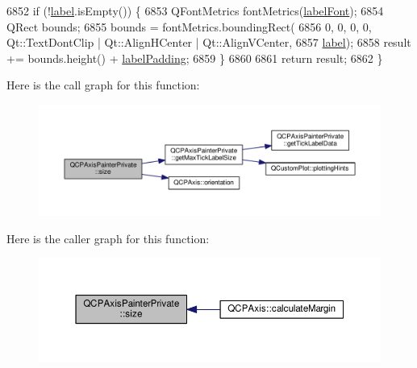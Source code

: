 \begin{DoxyCode}
6852   \textcolor{keywordflow}{if} (!\hyperlink{class_q_c_p_axis_painter_private_afe004c322f92543c0467afc02da6cf6d}{label}.isEmpty()) \{
6853     QFontMetrics fontMetrics(\hyperlink{class_q_c_p_axis_painter_private_add1ff1030fbc36112c19b1468ad82d55}{labelFont});
6854     QRect bounds;
6855     bounds = fontMetrics.boundingRect(
6856         0, 0, 0, 0, Qt::TextDontClip | Qt::AlignHCenter | Qt::AlignVCenter,
6857         \hyperlink{class_q_c_p_axis_painter_private_afe004c322f92543c0467afc02da6cf6d}{label});
6858     result += bounds.height() + \hyperlink{class_q_c_p_axis_painter_private_a3f7465372df132bf7814345ea697dd34}{labelPadding};
6859   \}
6860 
6861   \textcolor{keywordflow}{return} result;
6862 \}
\end{DoxyCode}


Here is the call graph for this function\+:\nopagebreak
\begin{figure}[H]
\begin{center}
\leavevmode
\includegraphics[width=350pt]{class_q_c_p_axis_painter_private_a8b2dc0bd2ccbf6bd450733ec9e410a38_cgraph}
\end{center}
\end{figure}




Here is the caller graph for this function\+:\nopagebreak
\begin{figure}[H]
\begin{center}
\leavevmode
\includegraphics[width=350pt]{class_q_c_p_axis_painter_private_a8b2dc0bd2ccbf6bd450733ec9e410a38_icgraph}
\end{center}
\end{figure}


\hypertarget{class_q_c_p_axis_painter_private_af02fc189ab8460c202eb4138c9aca516}{}
